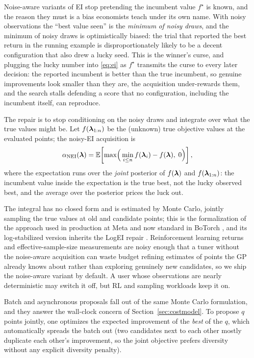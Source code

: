 Noise-aware variants of EI stop pretending the incumbent value
$f^{\star}$ is known, and the reason they must is a bias economists
teach under its own name. With noisy observations the ``best value
seen'' is the \emph{minimum of noisy draws}, and the minimum of noisy
draws is optimistically biased: the trial that reported the best return
in the running example is disproportionately likely to be a decent
configuration that also drew a lucky seed. This is the winner's curse,
and plugging the lucky number into \eqref{eq:ei} as $f^{\star}$
transmits the curse to every later decision: the reported incumbent is
better than the true incumbent, so genuine improvements look smaller
than they are, the acquisition under-rewards them, and the search
stalls defending a score that no configuration, including the
incumbent itself, can reproduce.

The repair is to stop conditioning on
the noisy draws and integrate over what the true values might be. Let
$f(\bm{\lambda}_{1:n})$ be the (unknown) true objective values at the
evaluated points; the noisy-EI acquisition is
\begin{equation}
\alpha_{\mathrm{NEI}}(\bm{\lambda})
= \mathbb{E}\!\left[ \max\!\Big( \min_{i \le n} f(\bm{\lambda}_i) - f(\bm{\lambda}),\; 0
\Big) \right],
\label{eq:nei}
\end{equation}
where the expectation runs over the \emph{joint} posterior of
$f(\bm{\lambda})$ and $f(\bm{\lambda}_{1:n})$: the incumbent value inside the
expectation is the true best, not the lucky observed best, and the
average over the posterior prices the luck out.

The integral has no
closed form and is estimated by Monte Carlo, jointly sampling the true
values at old and candidate points; this is the formalization of the
approach used in production at Meta and now standard in BoTorch
\citep{letham2019noisyei, balandat2020botorch}, and its log-stabilized
version inherits the LogEI repair \citep{ament2023logei}.
Reinforcement learning returns and effective-sample-size measurements
are noisy enough that a tuner without the noise-aware acquisition can
waste budget refining estimates of points the GP already knows about
rather than exploring genuinely new candidates, so we ship the
noise-aware variant by default. A user whose observations are nearly
deterministic may switch it off, but RL and sampling workloads keep
it on.

Batch and asynchronous proposals fall out of the same Monte Carlo
formulation, and they answer the wall-clock concern of
Section~\ref{sec:costmodel}. To propose $q$ points jointly, one optimizes
the expected improvement of the \emph{best} of the $q$, which
automatically spreads the batch out (two candidates next to each other
mostly duplicate each other's improvement, so the joint objective prefers
diversity without any explicit diversity penalty).

